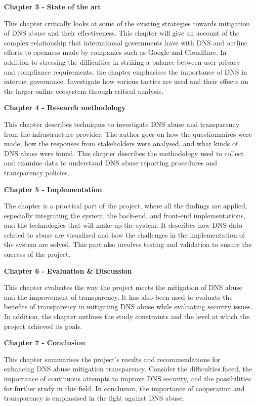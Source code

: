 \textbf{Chapter 3 -  State of the art }

This chapter critically looks at some of the existing strategies towards mitigation of DNS abuse and their effectiveness. This chapter will give an account of the complex relationship that international governments have with DNS and outline efforts to openness made by companies such as Google and Cloudflare. In addition to stressing the difficulties in striking a balance between user privacy and compliance requirements, the chapter emphasises the importance of DNS in internet governance. Investigate how various tactics are used and their effects on the larger online ecosystem through critical analysis.

\textbf{Chapter 4 -  Research methodology }

This chapter describes techniques to investigate DNS abuse and transparency from the infrastructure provider. The author goes on how the questionnaires were made, how the responses from stakeholders were analysed, and what kinds of DNS abuse were found. This chapter describes the methodology used to collect and examine data to understand DNS abuse reporting procedures and transparency policies.

\textbf{Chapter 5 -  Implementation }

The chapter is a practical part of the project, where all the findings are applied, especially integrating the system, the back-end, and front-end implementations, and the technologies that will make up the system. It describes how DNS data related to abuse are visualised and how the challenges in the implementation of the system are solved. This part also involves testing and validation to ensure the success of the project.

\textbf{Chapter 6 -  Evaluation \& Discussion }

This chapter evaluates the way the project meets the mitigation of DNS abuse and the improvement of transparency. It has also been used to evaluate the benefits of transparency in mitigating DNS abuse while evaluating security issues. In addition, the chapter outlines the study constraints and the level at which the project achieved its goals.

\textbf{Chapter 7 -  Conclusion }

This chapter summarises the project's results and recommendations for enhancing DNS abuse mitigation transparency. Consider the difficulties faced, the importance of continuous attempts to improve DNS security, and the possibilities for further study in this field. In conclusion, the importance of cooperation and transparency is emphasised in the fight against DNS abuse. 
